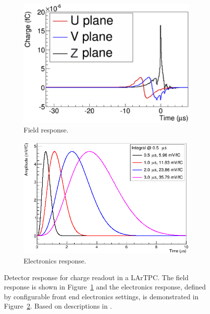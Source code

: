 \begin{figure}
  \centering
  \begin{subfigure}[t]{0.48\linewidth}
    \centering
    \includegraphics[width=0.98\textwidth]{FieldResponse.png}
    \caption{Field response.}
    \label{fig:FieldResponse}
  \end{subfigure}
  \hfill
  \begin{subfigure}[t]{0.48\linewidth}
    \centering
    \includegraphics[width=0.98\textwidth]{ElectronicsResponse.png}
    \caption{Electronics response.}
    \label{fig:ElectronicsResponse}
  \end{subfigure}
  \caption[Detector response for charge readout in a LArTPC.]{Detector response for charge readout in a LArTPC.  The field response is shown in Figure~\ref{fig:FieldResponse} and the electronics response, defined by configurable front end electronics settings, is demonstrated in Figure~\ref{fig:ElectronicsResponse}.  Based on descriptions in \cite{MicroBooNERawCharge2016}.}
  \label{fig:DetectorResponse}
\end{figure}

